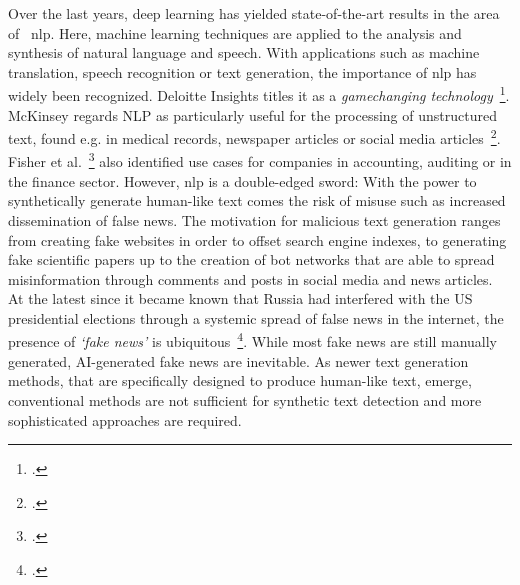 Over the last years, deep learning has yielded state-of-the-art results in the area of ~\gls{nlp}. Here, machine learning techniques are applied to the analysis and synthesis of natural language and speech. With applications such as machine translation, speech recognition or text generation, the importance of \gls{nlp} has widely been recognized. Deloitte Insights titles it as a \textit{gamechanging technology}~\footcite{briggs2019tech}. McKinsey regards NLP as particularly useful for the processing of unstructured text, found e.g. in medical records, newspaper articles or social media articles~\footcite{chui2017artificial}. Fisher et al.~\footcite{doi:10.1002/isaf.1386} also identified use cases for companies in accounting, auditing or in the finance sector. However, \gls{nlp} is a double-edged sword: With the power to synthetically generate human-like text comes the risk of misuse such as increased dissemination of false news. The motivation for malicious text generation ranges from creating fake websites in order to offset search engine indexes, to generating fake scientific papers up to the creation of bot networks that are able to spread misinformation through comments and posts in social media and news articles. At the latest since it became known that Russia had interfered with the US presidential elections through a systemic spread of false news in the internet, the presence of \textit{`fake news'} is ubiquitous~\footcite{allcott2017social}. While most fake news are still manually generated, AI-generated fake news are inevitable. As newer text generation methods, that are specifically designed to produce human-like text, emerge, conventional methods are not sufficient for synthetic text detection and more sophisticated approaches are required.

